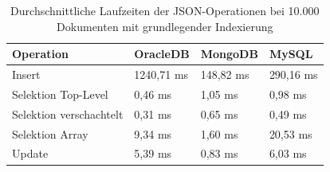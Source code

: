 \begin{table}[H]
\centering
\begin{tabular}{p{4cm}p{3cm}p{3cm}p{3cm}}
\hline
\textbf{Operation} & \textbf{OracleDB} & \textbf{MongoDB} & \textbf{MySQL} \\
\hline
Insert & 1240,71 ms & 148,82 ms & 290,16 ms \\
Selektion Top-Level & 0,46 ms & 1,05 ms & 0,98 ms \\
Selektion verschachtelt & 0,31 ms & 0,65 ms & 0,49 ms \\
Selektion Array & 9,34 ms & 1,60 ms & 20,53 ms \\
Update & 5,39 ms & 0,83 ms & 6,03 ms \\
\hline
\end{tabular}
\caption{Durchschnittliche Laufzeiten der JSON-Operationen bei 10.000 Dokumenten mit grundlegender Indexierung}
\label{tab:messwerte-json-indexiert}
\end{table}
